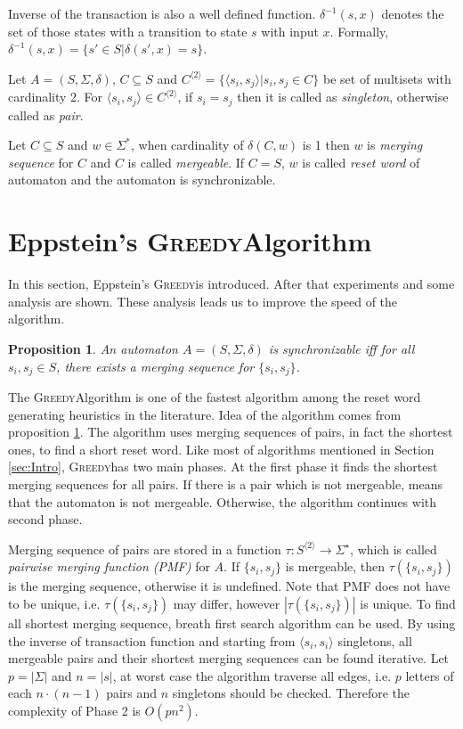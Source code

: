 \documentclass[12pt]{article}
\newtheorem{proposition}{Proposition}[section]
\newcommand{\greedyAlgo}{\textsc{Greedy}}
\begin{document}
Inverse of the transaction is also a well defined function. $\delta^{-1}(s,x)$ denotes the set of those states with a transition to state $s$ with input $x$. Formally, $\delta^{-1}(s,x) = \{ s' \in S | \delta(s',x)= s\}$.

Let $A=(S, \Sigma, \delta)$, $C \subseteq S$ and $C^{\langle 2 \rangle} = \{ \langle s_i, s_j \rangle | s_i,s_j \in C \}$ be set of multisets  with cardinality 2. For $\langle s_i, s_j \rangle \in C^{\langle 2 \rangle}$, if $s_i=s_j$ then it is called as \textit{singleton}, otherwise called as \textit{pair}. 

Let $C \subseteq S$ and $w \in \Sigma^*$, when cardinality of $\delta(C,w)$ is 1 then $w$ is \textit{merging sequence} for $C$ and $C$ is called \textit{mergeable}. If $C=S$, $w$ is called \textit{reset word} of automaton and the automaton is synchronizable.

\clearpage
\section{Eppstein's \greedyAlgo \space Algorithm}
\label{sec:greedy}
In this section, Eppstein's \greedyAlgo \space is introduced. After that experiments and some analysis are shown. These analysis leads us to improve the speed of the algorithm.

\begin{proposition}
	\label{prop:synchronizable}
	An automaton $A=(S,\Sigma,\delta)$ is synchronizable iff for all  $s_i,s_j \in S$, there exists a merging sequence for $\{ s_i, s_j \}$.
\end{proposition}

The \greedyAlgo \space Algorithm is one of the fastest algorithm among the reset word generating heuristics in the literature. Idea of the algorithm comes from proposition \ref{prop:synchronizable}. The algorithm uses merging sequences of pairs, in fact the shortest ones, to find a short reset word. Like most of algorithms mentioned in Section \ref{sec:Intro}, \greedyAlgo \space has two main phases. At the first phase it finds the shortest merging sequences for all pairs. If there is a pair which is not mergeable, means that the automaton is not mergeable. Otherwise, the algorithm continues with second phase.

Merging sequence of pairs are stored in a function $\tau : S^{\langle 2 \rangle} \rightarrow \Sigma^\star$, which is called \textit{pairwise merging function (PMF)} for $A$. If $\{ s_i, s_j \}$ is mergeable, then $\tau(\{ s_i, s_j \})$ is the merging sequence, otherwise it is undefined. Note that PMF does not have to be unique, i.e. $\tau(\{ s_i, s_j \})$ may differ, however  $|\tau(\{ s_i, s_j \})|$ is unique. To find all shortest merging sequence, breath first search algorithm can be used. By using the inverse of transaction function and starting from $\langle s_i, s_i \rangle$ singletons, all mergeable pairs and their shortest merging sequences can be found iterative. Let $p=|\Sigma|$ and $n=|s|$, at worst case the algorithm traverse all edges, i.e. $p$ letters of each $n\cdot(n-1)$ pairs and $n$ singletons should be checked. Therefore the complexity of Phase 2 is $O(pn^2)$. 
\end{document}
